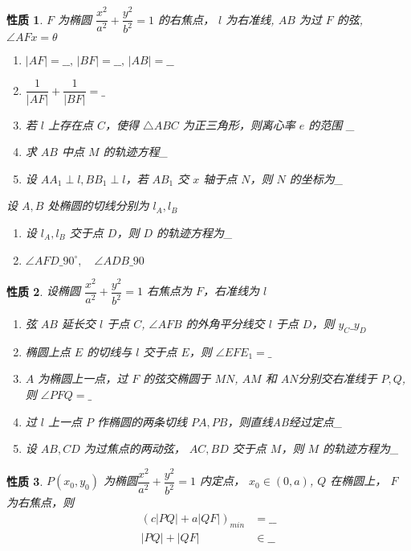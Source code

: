 \documentclass[a4paper,10pt,twoside]{article}
\newtheorem{proposition}{性质}
\begin{document}
\begin{proposition}
     $ F  $ 为椭圆 $ \dfrac{x^2}{a^2}+\dfrac{y^2}{b^2}=1  $ 的右焦点， $ l  $ 为右准线, $ AB  $ 为过 $ F  $ 的弦, $ \angle AFx=\theta  $ 
     \begin{enumerate}[ $ (1) $ ]
        \item  $ |AF|=\_\_,\,|BF|=\_\_,\,|AB|=\_\_ $
        \item  $ \dfrac{1}{|AF|}+\dfrac{1}{|BF|}=\_ $
        \item 若 $ l  $ 上存在点 $ C  $，使得 $ \triangle ABC  $ 为正三角形，则离心率 $ e $ 的范围 \_
        \item 求 $ AB  $ 中点 $ M  $ 的轨迹方程\_
        \item 设 $ AA_1\perp l,BB_1\perp l  $，若 $ AB_1  $ 交 $ x  $ 轴于点 $ N  $，则 $ N  $ 的坐标为\_  
     \end{enumerate}
     设 $ A,B  $ 处椭圆的切线分别为 $ l_A,l_B  $
     \begin{enumerate}
        \item[ $ (6 ) $ ] 设 $ l_A,l_B  $ 交于点 $ D  $，则 $ D  $ 的轨迹方程为\_
        \item[ $ (7 ) $ ]  $ \angle AFD\_90^{\circ },\quad \angle ADB\_ 90^{} $  
     \end{enumerate}
\end{proposition}
\begin{proposition}
    设椭圆 $ \dfrac{x^2}{a^2}+\dfrac{y^2}{b^2}=1 $ 右焦点为 $ F  $，右准线为 $ l  $ 
    \begin{enumerate}[ $ (1) $ ]
        \item 弦 $ AB  $ 延长交 $ l  $ 于点 $ C  $,  $ \angle AFB $ 的外角平分线交 $ l  $ 于点 $ D  $，则 $ y_C\_y_D $
        \item 椭圆上点 $ E  $ 的切线与 $ l  $ 交于点 $ E  $，则 $ \angle EFE_1=\_  $
        \item  $ A  $ 为椭圆上一点，过 $ F  $ 的弦交椭圆于 $ MN $, $ AM $ 和 $ AN  $分别交右准线于 $ P,Q $, 则 $ \angle PFQ=\_ $
        \item 过 $ l  $ 上一点 $ P  $ 作椭圆的两条切线 $ PA,PB $，则直线AB经过定点\_
        \item 设 $ AB,CD  $ 为过焦点的两动弦， $ AC,BD  $ 交于点 $ M   $，则 $ M  $ 的轨迹方程为\_    
    \end{enumerate}
\end{proposition}
\begin{proposition}
     $ P(x_0,y_0) $ 为椭圆$ \dfrac{x^2}{a^2}+\dfrac{y^2}{b^2}=1  $ 内定点， $ x_0\in(0,a) $, $ Q $ 在椭圆上，  $ F  $ 为右焦点，则
     \begin{align*}
        (c|PQ|+a|QF|)_{min}&=\_\_\\
        |PQ|+|QF|&\in\_\_
     \end{align*} 
\end{proposition}
\end{document}
